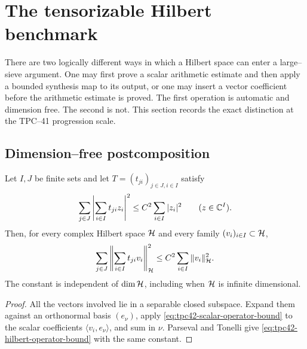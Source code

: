 \section{The tensorizable Hilbert benchmark}
\label{sec:tpc42-hilbert-large-sieve}

There are two logically different ways in which a Hilbert space can enter
a large--sieve argument.  One may first prove a scalar arithmetic estimate
and then apply a bounded synthesis map to its output, or one may insert a
vector coefficient before the arithmetic estimate is proved.  The first
operation is automatic and dimension free.  The second is not.  This
section records the exact distinction at the TPC--41 progression scale.

\subsection{Dimension--free postcomposition}

\begin{lemma}
\label{lem:tpc42-hilbert-tensorization}
Let \(I,J\) be finite sets and let \(T=(t_{ji})_{j\in J,i\in I}\) satisfy
\begin{equation}
 \sum_{j\in J}\left|\sum_{i\in I}t_{ji}z_i\right|^2
 \le C^2\sum_{i\in I}|z_i|^2
 \qquad(z\in\mathbb C^I).
 \label{eq:tpc42-scalar-operator-bound}
\end{equation}
Then, for every complex Hilbert space \(\mathcal H\) and every family
\((v_i)_{i\in I}\subset\mathcal H\),
\begin{equation}
 \sum_{j\in J}\left\|\sum_{i\in I}t_{ji}v_i\right\|_{\mathcal H}^2
 \le C^2\sum_{i\in I}\|v_i\|_{\mathcal H}^2.
 \label{eq:tpc42-hilbert-operator-bound}
\end{equation}
The constant is independent of \(\dim\mathcal H\), including when \(\mathcal H\) is
infinite dimensional.
\end{lemma}

\begin{proof}
All the vectors involved lie in a separable closed subspace.  Expand them
against an orthonormal basis \((e_\nu)\), apply
\eqref{eq:tpc42-scalar-operator-bound} to the scalar coefficients
\(\langle v_i,e_\nu\rangle\), and sum in \(\nu\).  Parseval and Tonelli give
\eqref{eq:tpc42-hilbert-operator-bound} with the same constant.
\end{proof}

